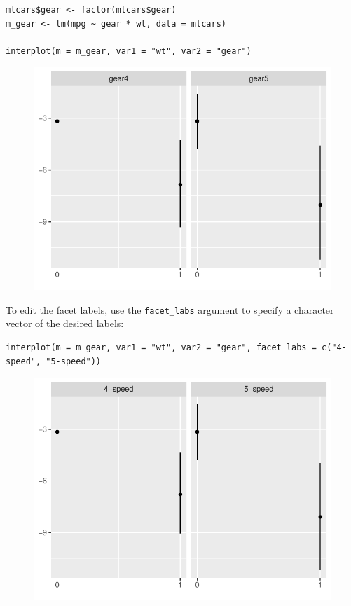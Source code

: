 \documentclass[
  article]{jss}
\begin{document}
\begin{verbatim}
mtcars$gear <- factor(mtcars$gear)
m_gear <- lm(mpg ~ gear * wt, data = mtcars)

interplot(m = m_gear, var1 = "wt", var2 = "gear")
\end{verbatim}

\begin{figure}[H]

{\centering \includegraphics{jss_manuscript_files/figure-pdf/unnamed-chunk-10-1.pdf}

}

\end{figure}

To edit the facet labels, use the \texttt{facet\_labs} argument to
specify a character vector of the desired labels:

\begin{verbatim}
interplot(m = m_gear, var1 = "wt", var2 = "gear", facet_labs = c("4-speed", "5-speed"))
\end{verbatim}

\begin{figure}[H]

{\centering \includegraphics{jss_manuscript_files/figure-pdf/unnamed-chunk-11-1.pdf}

}

\end{figure}
\end{document}

